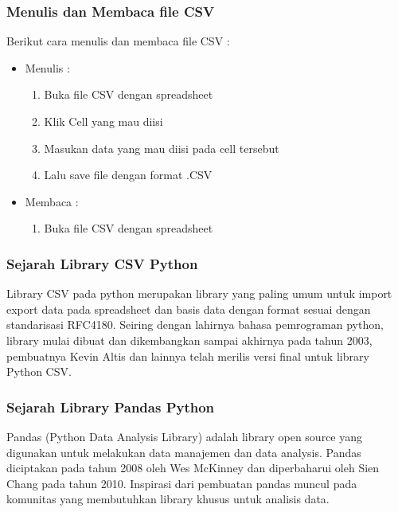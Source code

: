 \subsubsection{Menulis dan Membaca file CSV}
Berikut cara menulis dan membaca file CSV : 
\begin{itemize}
	\item Menulis : \begin{enumerate}
						\item Buka file CSV dengan spreadsheet
						\item Klik Cell yang mau diisi
						\item Masukan data yang mau diisi pada cell tersebut
						\item Lalu save file dengan format .CSV
					\end{enumerate}
	\item Membaca : \begin{enumerate}
						\item Buka file CSV dengan spreadsheet						
					\end{enumerate}
\end{itemize}
\subsubsection{Sejarah Library CSV Python}
Library CSV pada python merupakan library yang paling umum untuk import export data pada spreadsheet dan basis data dengan format sesuai dengan standarisasi RFC4180. Seiring dengan lahirnya bahasa pemrograman python, library mulai dibuat dan dikembangkan sampai akhirnya pada tahun 2003, pembuatnya Kevin Altis dan lainnya telah merilis versi final untuk library Python CSV. 
\subsubsection{Sejarah Library Pandas Python}
Pandas (Python Data Analysis Library) adalah library open source yang digunakan untuk melakukan data manajemen dan data analysis. Pandas diciptakan pada tahun 2008 oleh Wes McKinney dan diperbaharui oleh Sien Chang pada tahun 2010. Inspirasi dari pembuatan pandas muncul pada komunitas yang membutuhkan library khusus untuk analisis data. 
